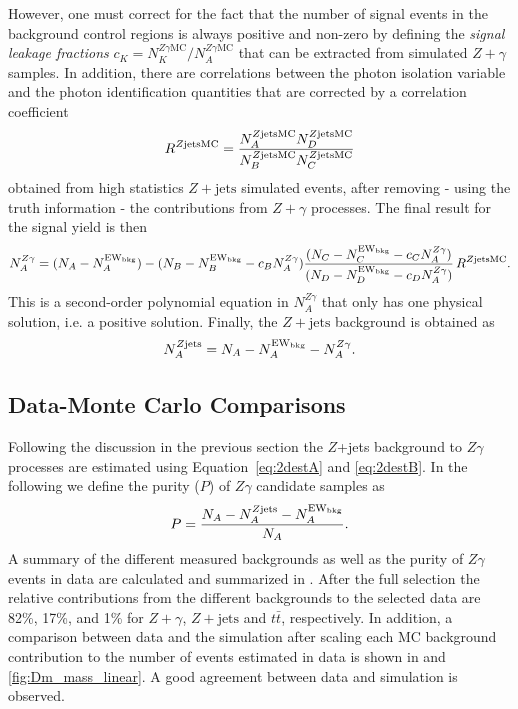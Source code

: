 However, one must correct for the fact that the number of signal events in the
background control regions is always positive and non-zero by defining the
\emph{signal leakage fractions} $c_K = N_K^{Z\gamma\text{MC}}/N_A^{Z\gamma\text{MC}}$
that can be extracted from simulated $Z+\gamma$ samples. In addition,
there are correlations between the photon isolation variable and the
photon identification quantities that are corrected by a correlation 
coefficient
\begin{equation} 
    R^{Z\text{jetsMC}} = \frac{N_{A}^{Z\text{jetsMC}} N_{D}^{Z\text{jetsMC}}}{N_{B}^{Z\text{jetsMC}} N_{C}^{Z\text{jetsMC}}}
\end{equation}
obtained from high statistics $Z+\text{jets}$ simulated events, after removing
- using the truth information - the contributions from $Z+\gamma$ processes.
The final result for the signal yield is then
\begin{equation}
   N_{A}^{Z\gamma} = (N_A - N_{A}^{\text{EW$_{\text{bkg}}$}}) - (N_B - N_{B}^{\text{EW$_{\text{bkg}}$}} - c_BN_{A}^{Z\gamma})\frac{(N_C - N_{C}^{\text{EW$_{\text{bkg}}$}} - c_CN_{A}^{Z\gamma})}{(N_D - N_{D}^{\text{EW$_{\text{bkg}}$}} - c_DN_{A}^{Z\gamma})}\,R^{Z\text{jetsMC}}.
\label{eq:2destB}
\end{equation}
This is a second-order polynomial equation in $N_A^{Z\gamma}$ that only has
one physical solution, i.e. a positive solution. Finally, the $Z+\text{jets}$
background is obtained as
\begin{equation}
N_{A}^{Z\text{jets}} = N_A - N_{A}^{\text{EW$_{\text{bkg}}$}} - N_{A}^{Z\gamma}.
\label{eq:2destA}
\end{equation}

\subsection{Data-Monte Carlo Comparisons}
Following the discussion in the previous section the $Z$+jets background to
$Z\gamma$ processes are estimated using Equation~\ref{eq:2destA} and \ref{eq:2destB}.
In the following we define the purity ($P$) of $Z\gamma$ candidate samples as
\[
    P = \frac{N_A - N_{A}^{Z\text{jets}} - N_{A}^{\text{EW$_{\text{bkg}}$}}}{N_A}.
\]
A summary of the different measured backgrounds as well as the purity of $Z\gamma$
events in data are calculated and summarized in .
After the full selection the relative contributions from the different backgrounds
to the selected data are 82\%, 17\%, and 1\% for $Z+\gamma$, $Z+\text{jets}$ and
$t\bar t$, respectively.
In addition, a comparison between data and the simulation after scaling each 
MC background contribution to the number of events estimated in data is shown in 
 and \ref{fig:Dm_mass_linear}. 
A good agreement between data and simulation is observed.

